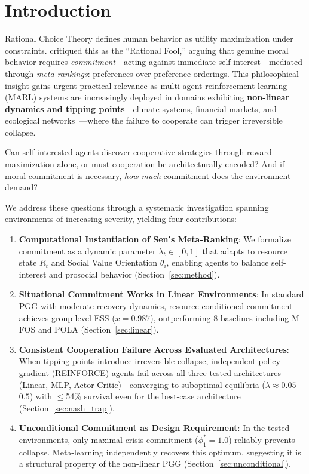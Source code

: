 \documentclass{article}
\begin{document}
\section{Introduction}

Rational Choice Theory defines human behavior as utility maximization under constraints.
\citet{sen1977rational} critiqued this as the ``Rational Fool,'' arguing that genuine moral behavior requires \textit{commitment}---acting against immediate self-interest---mediated through \textit{meta-rankings}: preferences over preference orderings.
This philosophical insight gains urgent practical relevance as multi-agent reinforcement learning (MARL) systems are increasingly deployed in domains exhibiting \textbf{non-linear dynamics and tipping points}---climate systems, financial markets, and ecological networks~\citep{lenton2008tipping}---where the failure to cooperate can trigger irreversible collapse.

Can self-interested agents discover cooperative strategies through reward maximization alone, or must cooperation be architecturally encoded?
And if moral commitment is necessary, \emph{how much} commitment does the environment demand?

We address these questions through a systematic investigation spanning environments of increasing severity, yielding four contributions:
\begin{enumerate}
    \item[(C1)] \textbf{Computational Instantiation of Sen's Meta-Ranking}: We formalize commitment as a dynamic parameter $\lambda_t \in [0,1]$ that adapts to resource state $R_t$ and Social Value Orientation $\theta_i$, enabling agents to balance self-interest and prosocial behavior (Section~\ref{sec:method}).
    \item[(C2)] \textbf{Situational Commitment Works in Linear Environments}: In standard PGG with moderate recovery dynamics, resource-conditioned commitment achieves group-level ESS ($\bar{x}=0.987$), outperforming 8 baselines including M-FOS and POLA (Section~\ref{sec:linear}).
    \item[(C3)] \textbf{Consistent Cooperation Failure Across Evaluated Architectures}: When tipping points introduce irreversible collapse, independent policy-gradient (REINFORCE) agents fail across all three tested architectures (Linear, MLP, Actor-Critic)---converging to suboptimal equilibria ($\lambda \approx 0.05$--$0.5$) with $\leq$54\% survival even for the best-case architecture (Section~\ref{sec:nash_trap}).
    \item[(C4)] \textbf{Unconditional Commitment as Design Requirement}: In the tested environments, only maximal crisis commitment ($\phi_1^* = 1.0$) reliably prevents collapse. Meta-learning independently recovers this optimum, suggesting it is a structural property of the non-linear PGG (Section~\ref{sec:unconditional}).
\end{enumerate}
\end{document}
